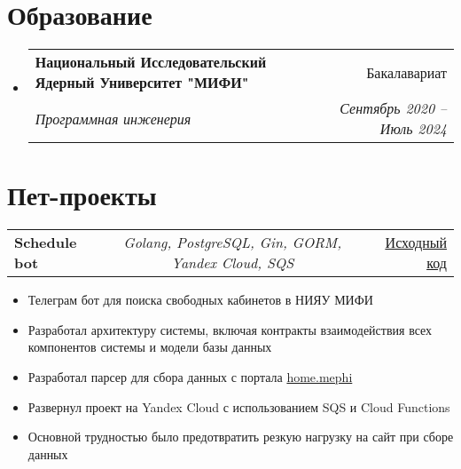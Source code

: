 \documentclass[a4paper,11pt]{article}
\makeatletter
\newcommand{\resumeItem}[1]{
  \item\small{#1}
}
\newcommand{\resumeItemListStart}{\begin{itemize}[rightmargin=0.11in]}
\newcommand{\resumeItemListEnd}{\end{itemize}}
\newcommand{\resumeTrioHeading}[3]{
  \item\small{
    \begin{tabular*}{0.96\textwidth}[t]{
      l@{\extracolsep{\fill}}c@{\extracolsep{\fill}}r
    }
      \textbf{#1} & \textit{#2} & #3
    \end{tabular*}
  }
}
\newcommand{\resumeQuadHeading}[4]{
  \item
  \begin{tabular*}{0.96\textwidth}[t]{l@{\extracolsep{\fill}}r}
    \textbf{#1} & #2 \\
    \textit{\small#3} & \textit{\small #4} \\
  \end{tabular*}
}
\newcommand{\resumeQuadHeadingChild}[2]{
  \item
  \begin{tabular*}{0.96\textwidth}[t]{l@{\extracolsep{\fill}}r}
    \textbf{\small#1} & {\small#2} \\
  \end{tabular*}
}
\newcommand{\resumeHeadingListStart}{
  \begin{itemize}[leftmargin=0.15in, label={}]
}
\newcommand{\resumeHeadingListEnd}{\end{itemize}}
\makeatother
\begin{document}



\section{Образование}
  \resumeHeadingListStart{}
    \resumeQuadHeading{Национальный Исследовательский Ядерный Университет "МИФИ"}{Бакалавариат}
    {Программная инженерия}{Сентябрь 2020 -- Июль 2024}
  \resumeHeadingListEnd{}



\section{Пет-проекты}
      \resumeTrioHeading{Schedule bot}{Golang, PostgreSQL, Gin, GORM, Yandex Cloud, SQS}{\href{https://github.com/PotatoHD404/ParallelDB}{\uline{Исходный код}}}
      \resumeItemListStart{}
        \resumeItem{Телеграм бот для поиска свободных кабинетов в НИЯУ МИФИ}
        \resumeItem{Разработал архитектуру системы, включая контракты взаимодействия всех компонентов системы и модели базы данных}
        \resumeItem{Разработал парсер для сбора данных с портала \href{https://home.mephi.ru}{home.mephi}}
        \resumeItem{Развернул проект на Yandex Cloud с использованием SQS и Cloud Functions}
        \resumeItem{Основной трудностью было предотвратить резкую нагрузку на сайт при сборе данных}
  \resumeHeadingListEnd{}
\end{document}
